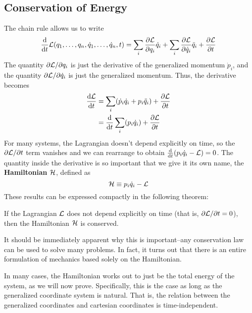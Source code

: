 \subsection*{Conservation of Energy}
The chain rule allows us to write
\[ \dv{t} \mathcal{L}(q_1, \dots, q_n, \dot q_1, \dots, \dot q_n, t) = \sum_i \pdv{\mathcal{L}}{q_i}\dot q_i + \sum_i \pdv{\mathcal{L}}{\dot q_i} \ddot q_i + \pdv{\mathcal{L}}{t} \]
The quantity $\partial \mathcal{L} / \partial q_i$ is just the derivative of the generalized momentum $\dot p_i$, and the quantity $\partial \mathcal{L}/\partial \dot q_i$ is just the generalized momentum. Thus, the derivative becomes
\begin{align*}
    \dv{\mathcal{L}}{t} &= \sum_i (\dot p_i \dot q_i + p_i \ddot q_i) + \pdv{\mathcal{L}}{t} \\
    &= \dv{t}\sum_i (p_i \dot q_i) + \pdv{\mathcal{L}}{t}
\end{align*}
For many systems, the Lagrangian doesn't depend explicitly on time, so the $\partial \mathcal{L}/\partial t$ term vanishes and we can rearrange to obtain $\dv{t} \pqty{p_i\dot q_i - \L } = 0$. The quantity inside the derivative is so important that we give it its own name, the \textbf{Hamiltonian} $\mathcal{H}$, defined as
\[ \mathcal{H} \equiv p_i \dot q_i - \mathcal{L} \]
These results can be expressed compactly in the following theorem:
\begin{theorem}
    If the Lagrangian $\mathcal{L}$ does not depend explicitly on time (that is, $\partial \mathcal{L}/\partial t = 0$), then the Hamiltonian $\mathcal{H}$ is conserved.
\end{theorem}
It should be immediately apparent why this is important--any conservation law can be used to solve many problems. In fact, it turns out that there is an entire formulation of mechanics based solely on the Hamiltonian. 

In many cases, the Hamiltonian works out to just be the total energy of the system, as we will now prove. Specifically, this is the case as long as the generalized coordinate system is natural. That is, the relation between the generalized coordinates and cartesian coordinates is time-independent. 

